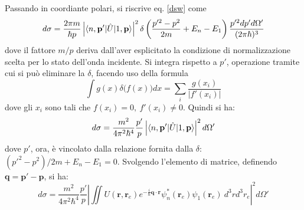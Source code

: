 \documentclass[11pt, a4paper]{scrartcl} %
\numberwithin{equation}{subsection}
\theoremstyle{style2}
\theoremstyle{style1}
\begin{document}
Passando in coordiante polari, si riscrive eq. \ref{dsw} come
\[
 d\sigma  = \frac{2\pi m }{\hbar p}\left\lvert \braket{n,\mathbf{p} '|\hat{U}|1,\mathbf{p} }  \right\rvert ^2 \delta \left(\frac{p'^2 - p^2}{2m}+E_n - E_1\right) \frac{p'^2 dp' d\Omega' }{(2\pi \hbar )^3}
\] 
dove il fattore $m / p$ deriva dall'aver esplicitato la condizione di normalizzazione scelta per lo stato dell'onda incidente.
Si integra rispetto a $p'$, operazione tramite cui si pu\`o eliminare la $\delta $, facendo uso della formula 
\[
\int g(x) \delta \big(f(x)\big) dx = \sum_{i}^{} \frac{g(x_i)}{\lvert f'(x_i) \rvert }
\] 
dove gli $x_i $ sono tali che $f(x_i) =0 , \ f'(x_i) \neq 0$. 
Quindi si ha:
\[
	d\sigma =  \frac{m^2}{4\pi^2 \hbar ^4} \frac{p'}{p}\left\lvert \braket{n,\mathbf{p'} |\hat{U}|1,\mathbf{p} }  \right\rvert ^2 d\Omega '
\] 
dove $p'$, ora, \`e vincolato dalla relazione fornita dalla $\delta $: $(p'^2 - p^2) / 2m + E_n - E_1 = 0$.
Svolgendo l'elemento di matrice, definendo $\mathbf{q} = \mathbf{p} ' - \mathbf{p} $, si ha:
\[
d\sigma  = \frac{m^2}{4\pi^2 \hbar ^4} \frac{p'}{p} \left\lvert \iint U(\mathbf{r} ,\mathbf{r} _e) e^{-\frac{i}{\hbar } \mathbf{q} \cdot \mathbf{r} } \psi ^*_n(\mathbf{r} _e) \psi _1 (\mathbf{r} _e)\  d^3 r d^3 r_e\right\rvert ^2 d\Omega '
\] 
\end{document}
